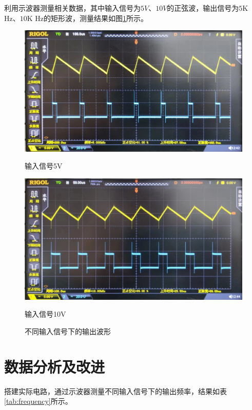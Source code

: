 \documentclass[12pt]{article}
\begin{document}
\newpage
利用示波器测量相关数据，其中输入信号为$5V$、$10V$的正弦波，输出信号为$5$K Hz、$10$K Hz的矩形波，测量结果如图\ref{fig:Real_waveform}所示。

\begin{figure}[htbp]
    \centering
    \begin{minipage}[t]{0.48\textwidth}
        \centering
        \includegraphics[width=\textwidth]{fig/5V.jpg}
        \caption*{输入信号5V}
    \end{minipage}
    \hfill
    \begin{minipage}[t]{0.48\textwidth}
        \centering
        \includegraphics[width=\textwidth]{fig/10V.jpg}
        \caption*{输入信号10V}
    \end{minipage}
    \caption{不同输入信号下的输出波形}
    \label{fig:Real_waveform}
\end{figure}

\section{数据分析及改进}

搭建实际电路，通过示波器测量不同输入信号下的输出频率，结果如表\ref{tab:frequency}所示。
\end{document}
